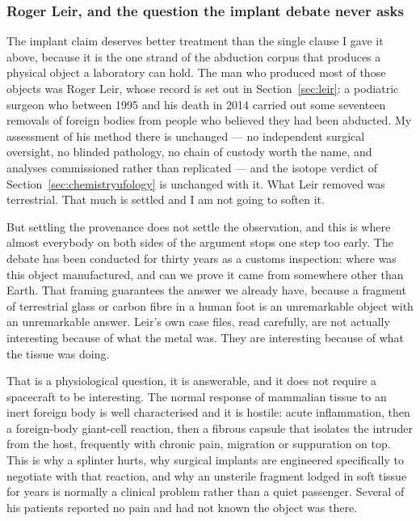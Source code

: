 \subsubsection*{Roger Leir, and the question the implant debate never asks}

The implant claim deserves better treatment than the single clause I gave it above, because it is
the one strand of the abduction corpus that produces a physical object a laboratory can hold. The
man who produced most of those objects was Roger Leir, whose record is set out in
Section~\ref{sec:leir}: a podiatric surgeon who between 1995 and his death in 2014 carried out some
seventeen removals of foreign bodies from people who believed they had been abducted. My assessment
of his method there is unchanged --- no independent surgical oversight, no blinded pathology, no
chain of custody worth the name, and analyses commissioned rather than replicated --- and the
isotope verdict of Section~\ref{sec:chemistryufology} is unchanged with it. What Leir removed was
terrestrial. That much is settled and I am not going to soften it.

But settling the provenance does not settle the observation, and this is where almost everybody on
both sides of the argument stops one step too early. The debate has been conducted for thirty years
as a customs inspection: where was this object manufactured, and can we prove it came from
somewhere other than Earth. That framing guarantees the answer we already have, because a fragment
of terrestrial glass or carbon fibre in a human foot is an unremarkable object with an
unremarkable answer. Leir's own case files, read carefully, are not actually interesting because of
what the metal was. They are interesting because of what the tissue was doing.


That is a physiological question, it is answerable, and it does not require a spacecraft to be
interesting. The normal response of mammalian tissue to an inert foreign body is well characterised
and it is hostile: acute inflammation, then a foreign-body giant-cell reaction, then a fibrous
capsule that isolates the intruder from the host, frequently with chronic pain, migration or
suppuration on top. This is why a splinter hurts, why surgical implants are engineered specifically
to negotiate with that reaction, and why an unsterile fragment lodged in soft tissue for years is
normally a clinical problem rather than a quiet passenger.  Several of his patients
reported no pain and had not known the object was there.

